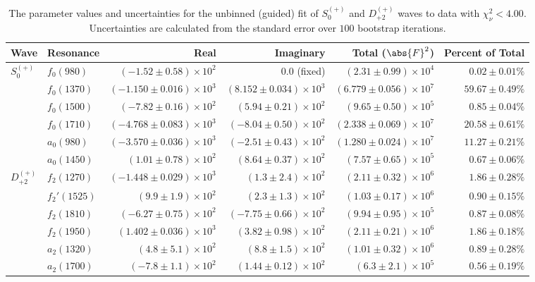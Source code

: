 \begin{table}[ht]
    \begin{center}
        \begin{tabular}{llrrrr}\toprule
        Wave & Resonance & Real & Imaginary & Total ($\abs{F}^2$) & Percent of Total \\\midrule
$S_{0}^{(+)}$ & $f_{0}(980)$ & $(-1.52 \pm 0.58) \times 10^{2}$ & $0.0$ (fixed) & $(2.31 \pm 0.99) \times 10^{4}$ & $0.02 \pm 0.01 \%$ \\
 & $f_{0}(1370)$ & $(-1.150 \pm 0.016) \times 10^{3}$ & $(8.152 \pm 0.034) \times 10^{3}$ & $(6.779 \pm 0.056) \times 10^{7}$ & $59.67 \pm 0.49 \%$ \\
 & $f_{0}(1500)$ & $(-7.82 \pm 0.16) \times 10^{2}$ & $(5.94 \pm 0.21) \times 10^{2}$ & $(9.65 \pm 0.50) \times 10^{5}$ & $0.85 \pm 0.04 \%$ \\
 & $f_{0}(1710)$ & $(-4.768 \pm 0.083) \times 10^{3}$ & $(-8.04 \pm 0.50) \times 10^{2}$ & $(2.338 \pm 0.069) \times 10^{7}$ & $20.58 \pm 0.61 \%$ \\
 & $a_{0}(980)$ & $(-3.570 \pm 0.036) \times 10^{3}$ & $(-2.51 \pm 0.43) \times 10^{2}$ & $(1.280 \pm 0.024) \times 10^{7}$ & $11.27 \pm 0.21 \%$ \\
 & $a_{0}(1450)$ & $(1.01 \pm 0.78) \times 10^{2}$ & $(8.64 \pm 0.37) \times 10^{2}$ & $(7.57 \pm 0.65) \times 10^{5}$ & $0.67 \pm 0.06 \%$ \\
$D_{+2}^{(+)}$ & $f_{2}(1270)$ & $(-1.448 \pm 0.029) \times 10^{3}$ & $(1.3 \pm 2.4) \times 10^{2}$ & $(2.11 \pm 0.32) \times 10^{6}$ & $1.86 \pm 0.28 \%$ \\
 & $f_{2}'(1525)$ & $(9.9 \pm 1.9) \times 10^{2}$ & $(2.3 \pm 1.3) \times 10^{2}$ & $(1.03 \pm 0.17) \times 10^{6}$ & $0.90 \pm 0.15 \%$ \\
 & $f_{2}(1810)$ & $(-6.27 \pm 0.75) \times 10^{2}$ & $(-7.75 \pm 0.66) \times 10^{2}$ & $(9.94 \pm 0.95) \times 10^{5}$ & $0.87 \pm 0.08 \%$ \\
 & $f_{2}(1950)$ & $(1.402 \pm 0.036) \times 10^{3}$ & $(3.82 \pm 0.98) \times 10^{2}$ & $(2.11 \pm 0.21) \times 10^{6}$ & $1.86 \pm 0.18 \%$ \\
 & $a_{2}(1320)$ & $(4.8 \pm 5.1) \times 10^{2}$ & $(8.8 \pm 1.5) \times 10^{2}$ & $(1.01 \pm 0.32) \times 10^{6}$ & $0.89 \pm 0.28 \%$ \\
 & $a_{2}(1700)$ & $(-7.8 \pm 1.1) \times 10^{2}$ & $(1.44 \pm 0.12) \times 10^{2}$ & $(6.3 \pm 2.1) \times 10^{5}$ & $0.56 \pm 0.19 \%$ \\\bottomrule
        \end{tabular}
    \caption{The parameter values and uncertainties for the unbinned (guided) fit of $S_{0}^{(+)}$ and $D_{+2}^{(+)}$ waves to data with $\chi^2_\nu < 4.00$. Uncertainties are calculated from the standard error over $100$ bootstrap iterations.}\label{tab:unbinned-fit-chisqdof-4.0-guided-Sp0p-Dp2p}
    \end{center}
\end{table}
